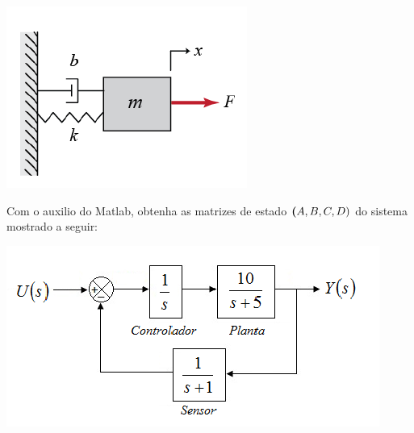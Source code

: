 \documentclass[a4paper, 10pt]{article}
\begin{document}
\begin{list}{\textbf{Questão .}}{
\setlength{\labelwidth}{-2mm} \setlength{\parsep}{0mm}
\setlength{\topsep}{0mm} \setlength{\leftmargin}{0mm}}
            \begin{center}
            \includegraphics[scale=0.6]{fig6a.png}
            \end{center}
 
\newpage
\item
    Com o auxilio do Matlab, obtenha as matrizes de estado $\textbf(A, B, C, D)$ do 
    sistema mostrado a seguir:
            \begin{center}
            \includegraphics[scale=0.6]{fig7.png}
            \end{center}
 
\end{list}
\end{document}
